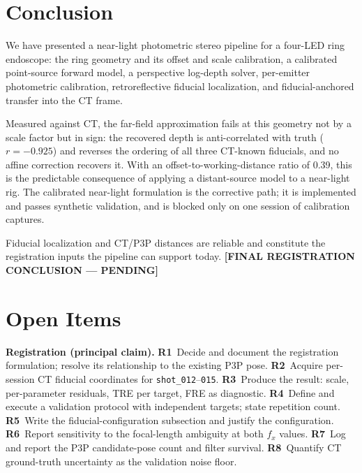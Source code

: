 \documentclass[journal,10pt]{IEEEtran}
\newcommand{\TODO}[1]{\textcolor{todoRed}{\textbf{[#1]}}}
\begin{document}
\section{Conclusion}
We have presented a near-light photometric stereo pipeline for a four-LED ring
endoscope: the ring geometry and its offset and scale calibration, a calibrated
point-source forward model, a perspective log-depth solver, per-emitter
photometric calibration, retroreflective fiducial localization, and
fiducial-anchored transfer into the CT frame.

Measured against CT, the far-field approximation fails at this geometry not by a
scale factor but in sign: the recovered depth is anti-correlated with truth
($r=-0.925$) and reverses the ordering of all three CT-known fiducials, and no
affine correction recovers it. With an offset-to-working-distance ratio of
\num{0.39}, this is the predictable consequence of applying a distant-source
model to a near-light rig. The calibrated near-light formulation is the
corrective path; it is implemented and passes synthetic validation, and is
blocked only on one session of calibration captures.

Fiducial localization and CT/P3P distances are reliable and constitute the
registration inputs the pipeline can support today.
\TODO{FINAL REGISTRATION CONCLUSION --- PENDING}

\appendices
\section{Open Items}\label{app:open}
\footnotesize
\textbf{Registration (principal claim).}
\textbf{R1}~Decide and document the registration formulation; resolve its
relationship to the existing P3P pose.
\textbf{R2}~Acquire per-session CT fiducial coordinates for
\texttt{shot\_012}--\texttt{015}.
\textbf{R3}~Produce the result: scale, per-parameter residuals, TRE per target,
FRE as diagnostic.
\textbf{R4}~Define and execute a validation protocol with independent targets;
state repetition count.
\textbf{R5}~Write the fiducial-configuration subsection and justify the
configuration.
\textbf{R6}~Report sensitivity to the focal-length ambiguity at both $f_x$
values.
\textbf{R7}~Log and report the P3P candidate-pose count and filter survival.
\textbf{R8}~Quantify CT ground-truth uncertainty as the validation noise floor.
\end{document}
